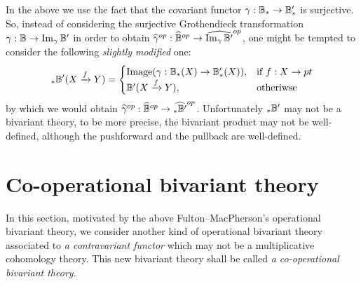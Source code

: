 \documentclass[a4paper]{amsart}
\begin{document}
\begin{rem}In the above we use the fact that the covariant functor $\gamma:\mathbb B_* \to \mathbb B'_*$ is surjective. So, instead of considering the surjective Grothendieck transformation $\gamma:\mathbb B \to \operatorname{Im}_{\gamma}\mathbb B'$ in order to obtain $\widehat{\gamma}^{op}: \widehat{\mathbb B}^{op} \to \widehat{\operatorname{Im}_{\gamma}\mathbb B'}^{op}$, one might be tempted to consider the following \emph{slightly modified} one:
$${}_*\mathbb B'(X \xrightarrow f Y) = \begin{cases}
\operatorname{Image}(\gamma:\mathbb B_*(X) \to \mathbb B'_*(X)), & \text {if $f:X \to pt$}\\
\mathbb B'(X \xrightarrow f Y),  & \text {otheriwse}
\end{cases}
$$
by which we would obtain $\widehat{\gamma}^{op}: \widehat{\mathbb B}^{op} \to \widehat{{}_*\mathbb B'}^{op}$. Unfortunately ${}_*\mathbb B'$ may not be a bivariant theory, to be more precise, the bivariant product may not be well-defined, although the pushforward and the pullback are well-defined.
\end{rem}
\section{Co-operational bivariant theory}\label{coop}
In this section, motivated by the above Fulton--MacPherson's operational bivariant theory, we consider another kind of operational bivariant theory associated to \emph{a contravariant functor} which may not be a multiplicative cohomology theory. This new bivariant theory shall be called \emph{a co-operational bivariant theory}.
\end{document}
